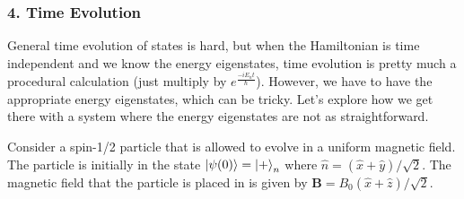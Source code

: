 \documentclass[
]{article}
\begin{document}
\hypertarget{time-evolution}{%
\subsubsection{4. Time Evolution}\label{time-evolution}}

General time evolution of states is hard, but when the Hamiltonian is
time independent and we know the energy eigenstates, time evolution is
pretty much a procedural calculation (just multiply by
\(e^\frac{-i E_n t}{\hbar}\)). However, we have to have the appropriate
energy eigenstates, which can be tricky. Let's explore how we get there
with a system where the energy eigenstates are not as straightforward.

Consider a spin-1/2 particle that is allowed to evolve in a uniform
magnetic field. The particle is initially in the state
\(\ket{\psi(0)} = \ket{+}_n\) where
\(\hat{n} = (\hat{x}+\hat{y})/\sqrt{2}\). The magnetic field that the
particle is placed in is given by
\(\mathbf{B} = B_0 (\hat{x}+\hat{z})/\sqrt{2}\).
\end{document}
